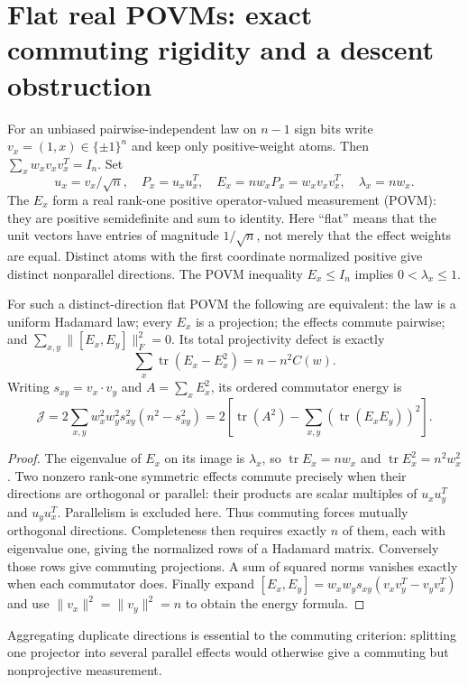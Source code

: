 \section{Flat real POVMs: exact commuting rigidity and a descent obstruction}
For an unbiased pairwise-independent law on $n-1$ sign bits write
$v_x=(1,x)\in\{\pm1\}^n$ and keep only positive-weight atoms.
Then $\sum_xw_xv_xv_x^T=I_n$. Set
\[
 u_x=v_x/\sqrt n,\quad P_x=u_xu_x^T,\quad
 E_x=nw_xP_x=w_xv_xv_x^T,\quad\lambda_x=nw_x.
\]
The $E_x$ form a real rank-one positive operator-valued measurement
(POVM): they are positive semidefinite and sum to identity.
Here ``flat'' means that the unit vectors have entries of magnitude
$1/\sqrt n$, not merely that the effect weights are equal.
Distinct atoms with the first coordinate normalized positive give
distinct nonparallel directions. The POVM inequality $E_x\le I_n$
implies $0<\lambda_x\le1$.

\begin{theorem}
For such a distinct-direction flat POVM the following are equivalent:
the law is a uniform Hadamard law; every $E_x$ is a projection;
the effects commute pairwise; and
$\sum_{x,y}\|[E_x,E_y]\|_F^2=0$.
Its total projectivity defect is exactly
\[
 \sum_x\operatorname{tr}(E_x-E_x^2)=n-n^2C(w).
\]
Writing $s_{xy}=v_x\cdot v_y$ and $A=\sum_xE_x^2$, its ordered
commutator energy is
\[
 \mathcal J=2\sum_{x,y}w_x^2w_y^2s_{xy}^2(n^2-s_{xy}^2)
 =2\left[\operatorname{tr}(A^2)-
                 \sum_{x,y}(\operatorname{tr}(E_xE_y))^2\right].
\]
\end{theorem}
\begin{proof}
The eigenvalue of $E_x$ on its image is $\lambda_x$, so
$\operatorname{tr}E_x=nw_x$ and $\operatorname{tr}E_x^2=n^2w_x^2$.
Two nonzero rank-one symmetric effects commute precisely when their
directions are orthogonal or parallel: their products are scalar
multiples of $u_xu_y^T$ and $u_yu_x^T$. Parallelism is excluded here.
Thus commuting forces mutually orthogonal directions. Completeness
then requires exactly $n$ of them, each with eigenvalue one, giving
the normalized rows of a Hadamard matrix. Conversely those rows give
commuting projections. A sum of squared norms vanishes exactly when
each commutator does. Finally expand
$[E_x,E_y]=w_xw_ys_{xy}(v_xv_y^T-v_yv_x^T)$ and use
$\|v_x\|^2=\|v_y\|^2=n$ to obtain the energy formula.
\end{proof}
Aggregating duplicate directions is essential to the commuting
criterion: splitting one projector into several parallel effects
would otherwise give a commuting but nonprojective measurement.

